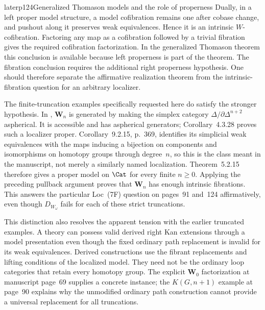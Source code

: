 \begin{dcomment}{later}{p124}{Generalized Thomason models and the role of properness}
Dually, in a left proper model structure, a model cofibration remains one after cobase change, and pushout along it preserves weak equivalences. Hence it is an intrinsic $W$-cofibration. Factoring any map as a cofibration followed by a trivial fibration gives the required cofibration factorization. In the generalized Thomason theorem this conclusion is available because left properness is part of the theorem. The fibration conclusion requires the additional right properness hypothesis. One should therefore separate the affirmative realization theorem from the intrinsic-fibration question for an arbitrary localizer.

The finite-truncation examples specifically requested here do satisfy the stronger hypothesis. In \citet[Section~9.2.1, p.~364]{Cisinski2006}, $\mathbf W_n$ is generated by making the simplex category $\Delta/\partial\Delta^{n+2}$ aspherical. It is accessible and has aspherical generators; Corollary~4.3.28 proves such a localizer proper. Corollary~9.2.15, p.~369, identifies its simplicial weak equivalences with the maps inducing a bijection on components and isomorphisms on homotopy groups through degree~$n$, so this is the class meant in the manuscript, not merely a similarly named localization. Theorem~5.2.15 therefore gives a proper model on $\Cat$ for every finite $n\geq0$. Applying the preceding pullback argument proves that $\mathbf W_n$ has enough intrinsic fibrations. This answers the particular Loc~(7F) question on pages~91 and~124 affirmatively, even though $D_{W_\omega}$ fails for each of these strict truncations.

This distinction also resolves the apparent tension with the earlier truncated examples. A theory can possess valid derived right Kan extensions through a model presentation even though the fixed ordinary path replacement is invalid for its weak equivalences. Derived constructions use the fibrant replacements and lifting conditions of the localized model. They need not be the ordinary loop categories that retain every homotopy group. The explicit $\mathbf W_0$ factorization at manuscript page~69 supplies a concrete instance; the $K(G,n+1)$ example at page~90 explains why the unmodified ordinary path construction cannot provide a universal replacement for all truncations.
\end{dcomment}
